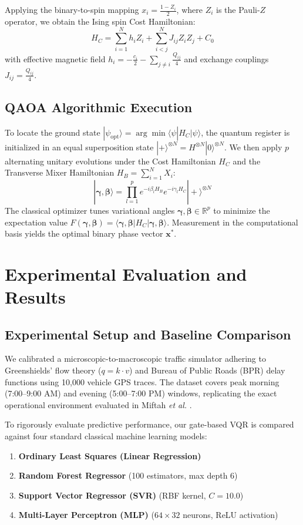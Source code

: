 \documentclass[journal,twoside]{IEEEtran}
\begin{document}
Applying the binary-to-spin mapping $x_i = \frac{1 - Z_i}{2}$, where $Z_i$ is the Pauli-$Z$ operator, we obtain the Ising spin Cost Hamiltonian:
\begin{equation}
    H_C = \sum_{i=1}^N h_i Z_i + \sum_{i < j}^N J_{ij} Z_i Z_j + C_0
\end{equation}
with effective magnetic field $h_i = -\frac{c_i}{2} - \sum_{j \neq i} \frac{Q_{ij}}{4}$ and exchange couplings $J_{ij} = \frac{Q_{ij}}{4}$.

\subsection{QAOA Algorithmic Execution}
To locate the ground state $|\psi_{\text{opt}}\rangle = \arg\min \langle \psi | H_C | \psi \rangle$, the quantum register is initialized in an equal superposition state $|+\rangle^{\otimes N} = H^{\otimes N} |0\rangle^{\otimes N}$. We then apply $p$ alternating unitary evolutions under the Cost Hamiltonian $H_C$ and the Transverse Mixer Hamiltonian $H_B = \sum_{i=1}^N X_i$:
\begin{equation}
    |\bm{\gamma}, \bm{\beta}\rangle = \prod_{l=1}^p e^{-i \beta_l H_B} e^{-i \gamma_l H_C} |+\rangle^{\otimes N}
\end{equation}
The classical optimizer tunes variational angles $\bm{\gamma}, \bm{\beta} \in \mathbb{R}^p$ to minimize the expectation value $F(\bm{\gamma}, \bm{\beta}) = \langle \bm{\gamma}, \bm{\beta} | H_C | \bm{\gamma}, \bm{\beta} \rangle$. Measurement in the computational basis yields the optimal binary phase vector $\mathbf{x}^*$.

\section{Experimental Evaluation and Results}

\subsection{Experimental Setup and Baseline Comparison}
We calibrated a microscopic-to-macroscopic traffic simulator adhering to Greenshields' flow theory ($q = k \cdot v$) and Bureau of Public Roads (BPR) delay functions using 10,000 vehicle GPS traces. The dataset covers peak morning (7:00--9:00 AM) and evening (5:00--7:00 PM) windows, replicating the exact operational environment evaluated in Miftah \textit{et al.} \cite{miftah2025big}.

To rigorously evaluate predictive performance, our gate-based VQR is compared against four standard classical machine learning models:
\begin{enumerate}
    \item \textbf{Ordinary Least Squares (Linear Regression)}
    \item \textbf{Random Forest Regressor} (100 estimators, max depth 6)
    \item \textbf{Support Vector Regressor (SVR)} (RBF kernel, $C=10.0$)
    \item \textbf{Multi-Layer Perceptron (MLP)} ($64 \times 32$ neurons, ReLU activation)
\end{enumerate}
\end{document}
